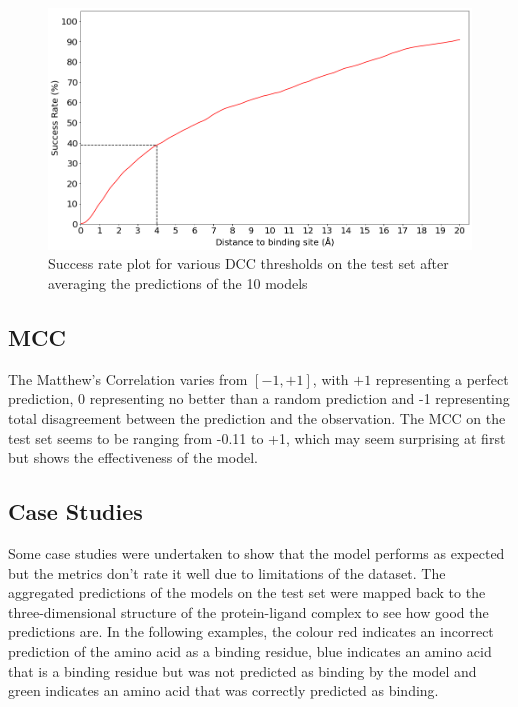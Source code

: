 \documentclass[journal=jacsat,manuscript=article]{achemso}
\begin{document}
\begin{figure}
    \centering
    \noindent\includegraphics[scale=0.45]{test_dcc.png}
    \caption{\centering Success rate plot for various DCC thresholds on the test set after averaging the predictions of the 10 models}
    \label{fig:test_dcc}
\end{figure}









\subsection{MCC}
\quad The Matthew's Correlation varies from $[-1, +1]$, with $+1$ representing a perfect prediction, 0 representing no better than a random prediction and -1 representing total disagreement between the prediction and the observation. The MCC on the test set seems to be ranging from -0.11 to +1, which may seem surprising at first but shows the effectiveness of the model.

\subsection{Case Studies}
\quad Some case studies were undertaken to show that the model performs as expected but the metrics don't rate it well due to limitations of the dataset. The aggregated predictions of the models on the test set were mapped back to the three-dimensional structure of the protein-ligand complex to see how good the predictions are. In the following examples, the colour red indicates an incorrect prediction of the amino acid as a binding residue, blue indicates an amino acid that is a binding residue but was not predicted as binding by the model and green indicates an amino acid that was correctly predicted as binding.
\end{document}
